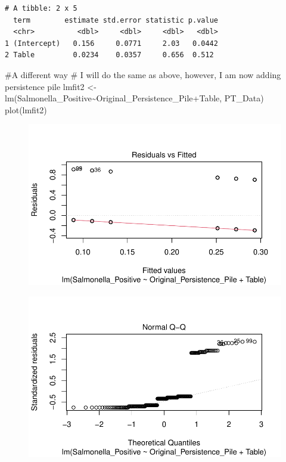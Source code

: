 \documentclass[
  letterpaper,
  DIV=11,
  numbers=noendperiod]{scrartcl}
\newenvironment{Shaded}{}{}
\newcommand{\CommentTok}[1]{\textcolor[rgb]{0.42,0.45,0.49}{#1}}
\newcommand{\FunctionTok}[1]{\textcolor[rgb]{0.44,0.26,0.76}{#1}}
\newcommand{\NormalTok}[1]{\textcolor[rgb]{0.14,0.16,0.18}{#1}}
\newcommand{\OtherTok}[1]{\textcolor[rgb]{0.44,0.26,0.76}{#1}}
\newcommand{\SpecialCharTok}[1]{\textcolor[rgb]{0.00,0.36,0.77}{#1}}
\begin{document}
\begin{verbatim}
# A tibble: 2 x 5
  term        estimate std.error statistic p.value
  <chr>          <dbl>     <dbl>     <dbl>   <dbl>
1 (Intercept)   0.156     0.0771     2.03   0.0442
2 Table         0.0234    0.0357     0.656  0.512 
\end{verbatim}

\begin{Shaded}
\begin{Highlighting}[]
\CommentTok{\#A different way }
\CommentTok{\# I will do the same as above, however, I am now adding persistence pile}
\NormalTok{lmfit2 }\OtherTok{\textless{}{-}} \FunctionTok{lm}\NormalTok{(Salmonella\_Positive}\SpecialCharTok{\textasciitilde{}}\NormalTok{Original\_Persistence\_Pile}\SpecialCharTok{+}\NormalTok{Table, PT\_Data) }
\FunctionTok{plot}\NormalTok{(lmfit2)}
\end{Highlighting}
\end{Shaded}

\begin{figure}[H]

{\centering \includegraphics{Supplementary_Material_files/figure-pdf/unnamed-chunk-3-5.pdf}

}

\end{figure}

\begin{figure}[H]

{\centering \includegraphics{Supplementary_Material_files/figure-pdf/unnamed-chunk-3-6.pdf}

}

\end{figure}
\end{document}
